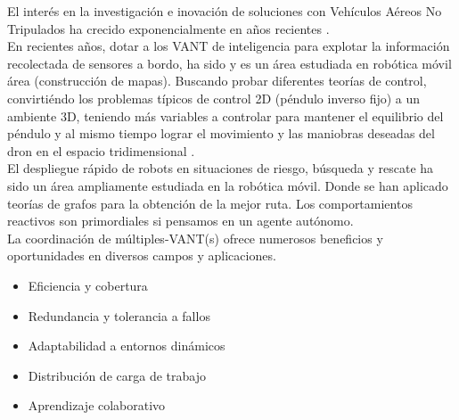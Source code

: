 \documentclass[11pt,epsf,times]{article}
\begin{document}
  El inter\'{e}s en la investigaci\'{o}n e inovaci\'{o}n de soluciones con Veh\'{i}culos A\'{e}reos No Tripulados ha crecido exponencialmente en a\~{n}os recientes \cite{Daponte2015,Lcady2014,GUPTA2016,VEGETACION2017,ROADS2017}.\\
  
  En recientes a\~{n}os, dotar a los VANT de inteligencia para explotar la informaci\'{o}n recolectada de sensores a bordo, ha sido y es un \'{a}rea estudiada en rob\'{o}tica m\'{o}vil \'{a}rea (construcci\'{o}n de mapas)\cite{SHUKLA2016490}. Buscando probar diferentes teor\'{i}as de control, convirti\'{e}ndo los problemas t\'{i}picos de control 2D (p\'{e}ndulo inverso fijo) a un ambiente 3D, teniendo m\'{a}s variables a controlar para mantener el equilibrio del p\'{e}ndulo y al mismo tiempo lograr el movimiento y las maniobras deseadas del dron en el espacio tridimensional \cite{PENDU2011}.\\
  
  El despliegue r\'{a}pido de robots en situaciones de riesgo, b\'{u}squeda y rescate ha sido un \'{a}rea ampliamente estudiada en la rob\'{o}tica m\'{o}vil. Donde se han aplicado teor\'{i}as de grafos para la obtenci\'{o}n de la mejor ruta. Los comportamientos reactivos son primordiales si pensamos en un agente aut\'{o}nomo.\\ %

La coordinaci\'{o}n de m\'{u}ltiples-VANT(s) ofrece numerosos beneficios y oportunidades en diversos campos y aplicaciones.

\begin{multicols}{2}
  \begin{itemize}
  \item Eficiencia y cobertura
  \item Redundancia y tolerancia a fallos
  \item Adaptabilidad a entornos din\'{a}micos
  \item Distribuci\'{o}n de carga de trabajo
  \item Aprendizaje colaborativo
  \end{itemize}
\end{multicols}

\newpage
\end{document}
